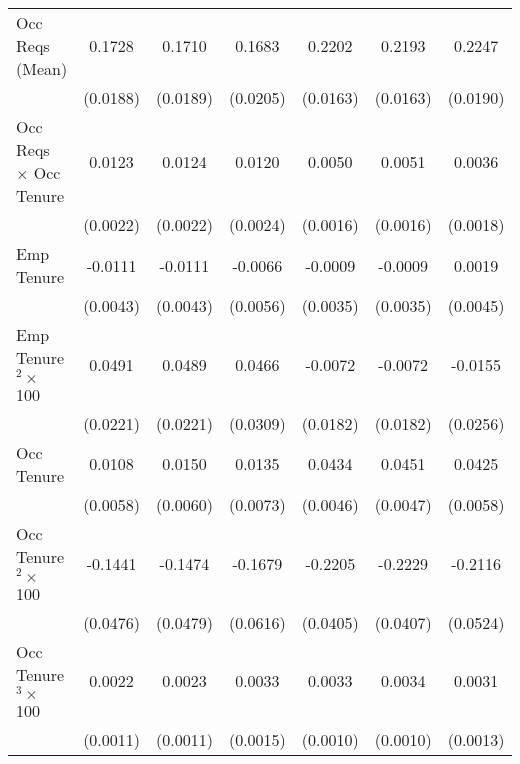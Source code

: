 {\begin{longtable}{l*{6}{c}}
Occ Reqs (Mean)     &      0.1728\sym{***}&      0.1710\sym{***}&      0.1683\sym{***}&      0.2202\sym{***}&      0.2193\sym{***}&      0.2247\sym{***}\\
                    &    (0.0188)         &    (0.0189)         &    (0.0205)         &    (0.0163)         &    (0.0163)         &    (0.0190)         \\
Occ Reqs $\times$ Occ Tenure&      0.0123\sym{***}&      0.0124\sym{***}&      0.0120\sym{***}&      0.0050\sym{***}&      0.0051\sym{***}&      0.0036\sym{**} \\
                    &    (0.0022)         &    (0.0022)         &    (0.0024)         &    (0.0016)         &    (0.0016)         &    (0.0018)         \\
Emp Tenure          &     -0.0111\sym{***}&     -0.0111\sym{**} &     -0.0066         &     -0.0009         &     -0.0009         &      0.0019         \\
                    &    (0.0043)         &    (0.0043)         &    (0.0056)         &    (0.0035)         &    (0.0035)         &    (0.0045)         \\
Emp Tenure$^2\times$ 100&      0.0491\sym{**} &      0.0489\sym{**} &      0.0466         &     -0.0072         &     -0.0072         &     -0.0155         \\
                    &    (0.0221)         &    (0.0221)         &    (0.0309)         &    (0.0182)         &    (0.0182)         &    (0.0256)         \\
Occ Tenure          &      0.0108\sym{*}  &      0.0150\sym{**} &      0.0135\sym{*}  &      0.0434\sym{***}&      0.0451\sym{***}&      0.0425\sym{***}\\
                    &    (0.0058)         &    (0.0060)         &    (0.0073)         &    (0.0046)         &    (0.0047)         &    (0.0058)         \\
Occ Tenure$^2\times$ 100&     -0.1441\sym{***}&     -0.1474\sym{***}&     -0.1679\sym{***}&     -0.2205\sym{***}&     -0.2229\sym{***}&     -0.2116\sym{***}\\
                    &    (0.0476)         &    (0.0479)         &    (0.0616)         &    (0.0405)         &    (0.0407)         &    (0.0524)         \\
Occ Tenure$^3\times$ 100&      0.0022\sym{*}  &      0.0023\sym{**} &      0.0033\sym{**} &      0.0033\sym{***}&      0.0034\sym{***}&      0.0031\sym{**} \\
                    &    (0.0011)         &    (0.0011)         &    (0.0015)         &    (0.0010)         &    (0.0010)         &    (0.0013)         \\

\end{longtable}}
